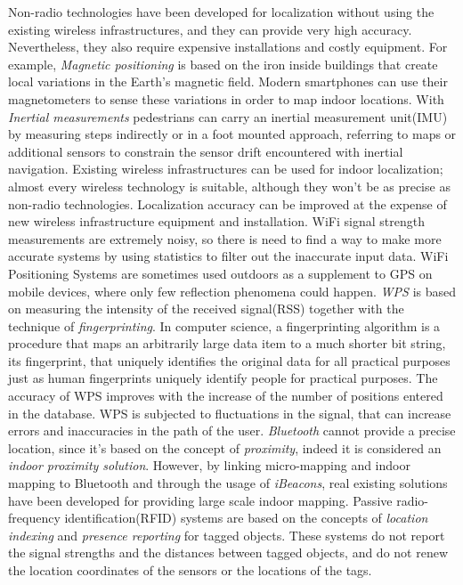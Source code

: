 Non-radio technologies have been developed for localization without using the existing wireless infrastructures, and they can provide very high accuracy.
Nevertheless, they also require expensive installations and costly equipment.
For example, \textit{Magnetic positioning} is based on the iron inside buildings that create local variations in the Earth’s magnetic field.
Modern smartphones can use their magnetometers to sense these variations in order to map indoor locations.
With \textit{Inertial measurements} pedestrians can carry an inertial measurement unit(IMU) by measuring steps indirectly or in a foot mounted approach, referring to maps or additional sensors to constrain the sensor drift encountered with inertial navigation.
Existing wireless infrastructures can be used for indoor localization; almost every wireless technology is suitable, although they won't be as precise as non-radio technologies.
Localization accuracy can be improved at the expense of new wireless infrastructure equipment and installation.
WiFi signal strength measurements are extremely noisy, so there is need to find a way to make more accurate systems by using statistics to filter out the inaccurate input data. WiFi Positioning Systems are sometimes used outdoors as a supplement to GPS on mobile devices, where only few reflection phenomena could happen.
\textit{WPS} is based on measuring the intensity of the received signal(RSS) together with the technique of \textit{fingerprinting}.
In computer science, a fingerprinting algorithm is a procedure that maps an arbitrarily large data item to a much shorter bit string, its fingerprint, that uniquely identifies the original data for all practical purposes just as human fingerprints uniquely identify people for practical purposes.
The accuracy of WPS improves with the increase of the number of positions entered in the database.
WPS is subjected to fluctuations in the signal, that can increase errors and inaccuracies in the path of the user.
\textit{Bluetooth} cannot provide a precise location, since it's based on the concept of \textit{proximity}, indeed it is considered an \textit{indoor proximity solution}.
However, by linking micro-mapping and indoor mapping to Bluetooth and through the usage of \textit{iBeacons}, real existing solutions have been developed for providing large scale indoor mapping.
Passive radio-frequency identification(RFID) systems are based on the concepts of \textit{location indexing} and \textit{presence reporting} for tagged objects.
These systems do not report the signal strengths and the distances between tagged objects, and do not renew the location coordinates of the sensors or the locations of the tags.

